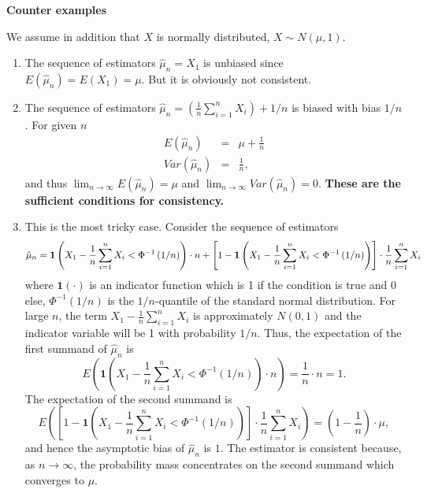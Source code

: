 \documentclass{article}
\begin{document}
\begin{solution}
\textbf{Counter examples}

We assume in addition that $X$ is normally distributed, $X\sim N\left( \mu
,1\right) $.

\begin{enumerate}
\item The sequence of estimators $\hat{\mu}_{n}=X_{1}$ is unbiased since $%
E\left( \hat{\mu}_{n}\right) =E\left( X_{1}\right) =\mu $. But it is
obviously not consistent.

\item The sequence of estimators $\hat{\mu}_{n}=\left( \frac{1}{n}%
\sum_{i=1}^{n}X_{i}\right) +1/n$ is biased with bias $1/n$. For given $n$
\begin{eqnarray*}
E\left( \hat{\mu}_{n}\right)  &=&\mu +\frac{1}{n} \\
Var\left( \hat{\mu}_{n}\right)  &=&\frac{1}{n},
\end{eqnarray*}%
and thus $\lim_{n\rightarrow \infty }E\left( \hat{\mu}_{n}\right) =\mu $
and $\lim_{n\rightarrow \infty }Var\left( \hat{\mu}_{n}\right) =0$.
\textbf{These are the sufficient conditions for consistency.}

\item This is the most tricky case. Consider the sequence of estimators%
\begin{equation*}
\hat{\mu}_{n}=\mathbf{1}\left( X_{1}-\frac{1}{n}\sum_{i=1}^{n}X_{i}<\Phi
^{-1}\left( 1/n\right) \right) \cdot n+\left[ 1-\mathbf{1}\left( X_{1}-\frac{%
1}{n}\sum_{i=1}^{n}X_{i}<\Phi ^{-1}\left( 1/n\right) \right) \right] \cdot
\frac{1}{n}\sum_{i=1}^{n}X_{i}
\end{equation*}%
where $\mathbf{1}\left( \cdot \right) $ is an indicator function which is 1
if the condition is true and 0 else, $\Phi ^{-1}\left( 1/n\right) $ is the $%
1/n$-quantile of the standard normal distribution. For large $n$, the term $%
X_{1}-\frac{1}{n}\sum_{i=1}^{n}X_{i}$ is approximately $N\left( 0,1\right) $
and the indicator variable will be 1 with probability $1/n$. Thus, the
expectation of the first summand of $\hat{\mu}_{n}$ is%
\begin{equation*}
E\left( \mathbf{1}\left( X_{1}-\frac{1}{n}\sum_{i=1}^{n}X_{i}<\Phi
^{-1}\left( 1/n\right) \right) \cdot n\right) =\frac{1}{n}\cdot n=1.
\end{equation*}%
The expectation of the second summand is%
\begin{equation*}
E\left( \left[ 1-\mathbf{1}\left( X_{1}-\frac{1}{n}\sum_{i=1}^{n}X_{i}<\Phi
^{-1}\left( 1/n\right) \right) \right] \cdot \frac{1}{n}\sum_{i=1}^{n}X_{i}%
\right) =\left( 1-\frac{1}{n}\right) \cdot \mu ,
\end{equation*}%
and hence the asymptotic bias of $\hat{\mu}_{n}$ is $1$. The estimator is
consistent because, as $n\rightarrow \infty $, the probability mass
concentrates on the second summand which converges to $\mu $.
\end{enumerate}
\end{solution}
\end{document}
